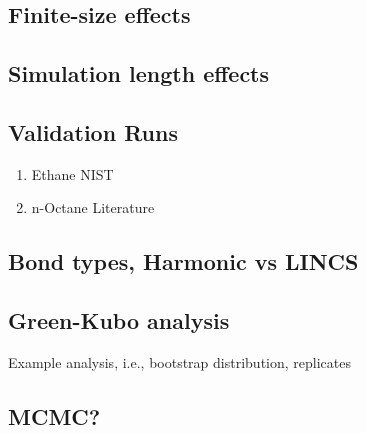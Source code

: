 \documentclass[11pt,a4paper]{article}
\begin{document}
\subsection{Finite-size effects}

\subsection{Simulation length effects}

\subsection{Validation Runs}

\begin{enumerate}
	\item Ethane NIST
	\item n-Octane Literature
\end{enumerate}

\subsection{Bond types, Harmonic vs LINCS}

\subsection{Green-Kubo analysis}

Example analysis, i.e., bootstrap distribution, replicates

\subsection{MCMC?}
\end{document}
